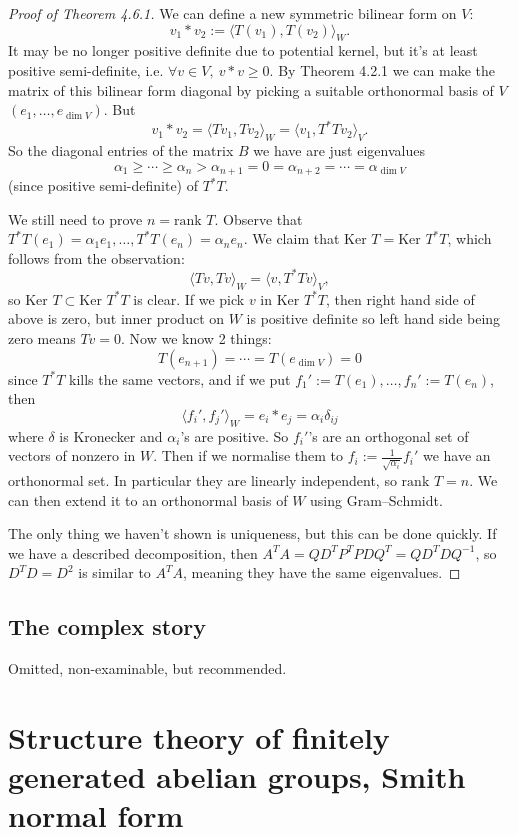 \documentclass[a4paper]{article}
\newcommand{\Ker}{\text{Ker }}
\newcommand{\rank}{\text{rank }}
\theoremstyle{definition}
\begin{document}
\begin{proof}[Proof of Theorem 4.6.1]
We can define a new symmetric bilinear form on $V$:
\[
v_1 \ast v_2 := \langle T(v_1) , T(v_2)\rangle_W.
\]
It may be no longer positive definite due to potential kernel, but it's at least positive semi-definite, i.e. $\forall v \in V,\ v \ast v \geq 0.$ By Theorem 4.2.1 we can make the matrix of this bilinear form diagonal by picking a suitable orthonormal basis of $V$ $(e_1,\ldots,e_{\dim V})$. But
\[
v_1 \ast v_2 = \langle Tv_1, Tv_2 \rangle_W = \langle v_1, T^\ast T v_2 \rangle_V.
\]
So the diagonal entries of the matrix $B$ we have are just eigenvalues
\[
\alpha_1 \geq \cdots \geq \alpha_n > \alpha_{n+1}=0=\alpha_{n+2} = \cdots = \alpha_{\dim V}
\]
(since positive semi-definite) of $T^\ast T$. 

We still need to prove $n=\rank T$. Observe that $T^\ast T(e_1) = \alpha_1 e_1, \ldots, T^\ast T(e_n) = \alpha_n e_n.$ We claim that $\Ker T= \Ker T^\ast T$, which follows from the observation:
\[
\langle Tv, Tv \rangle_W=\langle v,T^\ast Tv \rangle_V,
\]
so $\Ker T \subset \Ker T^\ast T$ is clear. If we pick $v$ in $\Ker T^\ast T$, then right hand side of above is zero, but inner product on $W$ is positive definite so left hand side being zero means $Tv=0$. Now we know 2 things: 
\[
T(e_{n+1}) = \cdots = T(e_{\dim V}) =0
\]
since $T^\ast T$ kills the same vectors, and if we put $f_1':= T(e_1), \ldots, f_n':=T(e_n)$, then
\[
\langle f_i' , f_j' \rangle_W = e_i \ast e_j = \alpha_i \delta_{ij}
\]
where $\delta$ is Kronecker and $\alpha_i$'s are positive. So $f_i'$'s are an orthogonal set of vectors of nonzero in $W$. Then if we normalise them to $f_i:=\frac{1}{\sqrt{\alpha_i}} f_i'$ we have an orthonormal set. In particular they are linearly independent, so $\rank T=n$. We can then extend it to an orthonormal basis of $W$ using Gram–Schmidt.

The only thing we haven't shown is uniqueness, but this can be done quickly. If we have a described decomposition, then $A^T A= QD^T P^T PDQ^T=QD^T D Q^{-1}$, so $D^TD=D^2$ is similar to $A^TA$, meaning they have the same eigenvalues.
\end{proof}

\subsection{The complex story}
Omitted, non-examinable, but recommended.

\section{Structure theory of finitely generated abelian groups, Smith normal form}
\end{document}
